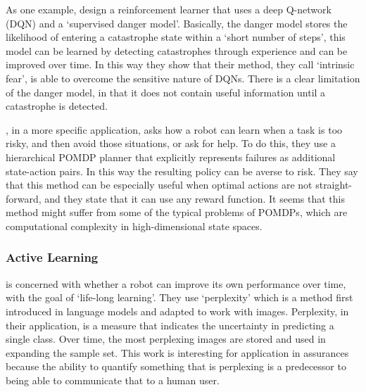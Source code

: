     As one example, \citet{Lipton2016-dq} design a reinforcement learner that uses a deep Q-network (DQN) and a `supervised danger model'. Basically, the danger model stores the likelihood of entering a catastrophe state within a `short number of steps', this model can be learned by detecting catastrophes through experience and can be improved over time.  In this way they show that their method, they call `intrinsic fear', is able to overcome the sensitive nature of DQNs. There is a clear limitation of the danger model, in that it does not contain useful information until a catastrophe is detected. 

    \citet{Curran2016-ij}, in a more specific application, asks how a robot can learn when a task is too risky, and then avoid those situations, or ask for help. To do this, they use a hierarchical POMDP planner that explicitly represents failures as additional state-action pairs. In this way the resulting policy can be averse to risk. They say that this method can be especially useful when optimal actions are not straight-forward, and they state that it can use any reward function. It seems that this method might suffer from some of the typical problems of POMDPs, which are computational complexity in high-dimensional state spaces.

\subsubsection{Active Learning} \label{sec:active_learning}
    \citet{Paul2011-vr} is concerned with whether a robot can improve its own performance over time, with the goal of `life-long learning'. They use `perplexity' which is a method first introduced in language models and adapted to work with images. Perplexity, in their application, is a measure that indicates the uncertainty in predicting a single class. Over time, the most perplexing images are stored and used in expanding the sample set. This work is interesting for application in assurances because the ability to quantify something that is perplexing is a predecessor to being able to communicate that to a human user.


